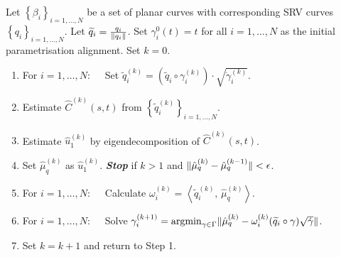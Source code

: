 \begin{algorithm}
  \label{algo:mean}
  Let $\left\{\beta_i\right\}_{i=1,\dots,N}$ be a set of planar curves with corresponding SRV curves $\left\{ q_i \right\}_{i=1,\dots,N}$.
  Let $\widetilde q_i = \frac{q_i}{\lVert q_i\rVert}$.
  Set $\gamma_i^0(t) = t$ for all $i=1,\dots,N$ as the initial parametrisation alignment.
  Set $k = 0$. 
  \begin{enumerate}
    \item For $i=1,\dots,N: \quad$ Set $\widetilde q_i^{(k)} = \left( \widetilde q_i \circ \gamma^{(k)}_i \right) \cdot \sqrt{\dot\gamma_i^{(k)}}$.
    \item Estimate $\hat C^{(k)}(s,t)$ from $\left\{\widetilde q_i^{(k)}\right\}_{i=1,\dots,N}$. 
    \item Estimate $\hat u_1^{(k)}$ by eigendecomposition of $\hat C^{(k)}(s,t)$.
    \item Set $\hat\mu_q^{(k)}$ as $\hat u_1^{(k)}$. \emph{\textbf{Stop}} if $k>1$ and $\lVert\hat\mu_q^{(k)} - \hat\mu_q^{(k-1)}\rVert < \epsilon$.
    \item For $i=1,\dots,N:\quad$ Calculate $\omega^{(k)}_i = \left\langle \widetilde q_i^{(k)},\, \hat\mu_q^{(k)} \right\rangle$.
    \item For $i=1,\dots,N:\quad$ Solve $\gamma_i^{(k+1)} = \operatorname*{argmin}_{\gamma \in \Gamma} \lVert\hat\mu_q^{(k)} - \omega_i^{(k)} (\widetilde q_i \circ \gamma ) \sqrt{\dot\gamma}\rVert$.
    \item Set $k = k+1$ and return to Step 1.
  \end{enumerate}
\end{algorithm}

